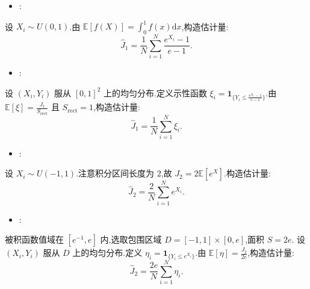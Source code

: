 \documentclass[../main.tex]{subfiles}
\begin{document}
\begin{solution}


\begin{itemize}
    \item {}:
\end{itemize}
    设 $X_i \sim U(0, 1)$.由 $\mathbb{E}[f(X)] = \int_0^1 f(x)\mathrm{d}x$,构造估计量:
    $$\hat{J}_1 = \frac{1}{N} \sum_{i=1}^N \frac{e^{X_i} - 1}{e - 1}.$$
\begin{itemize}
    \item {}:
\end{itemize}
    设 $(X_i, Y_i)$ 服从 $[0, 1]^2$ 上的均匀分布.定义示性函数 $\xi_i = \mathbf{1}_{\{Y_i \le \frac{e^{X_i}-1}{e-1}\}}$.由 $\mathbb{E}[\xi] = \frac{J_1}{S_{\text{rect}}}$ 且 $S_{\text{rect}}=1$,构造估计量:
    $$\hat{J}_1 = \frac{1}{N} \sum_{i=1}^N \xi_i.$$


\begin{itemize}
    \item {}:
\end{itemize}
    设 $X_i \sim U(-1, 1)$.注意积分区间长度为 $2$,故 $J_2 = 2\mathbb{E}[e^X]$.构造估计量:
    $$\hat{J}_2 = \frac{2}{N} \sum_{i=1}^N e^{X_i}.$$
\begin{itemize}
    \item {}:
\end{itemize}
    被积函数值域在 $[e^{-1}, e]$ 内,选取包围区域 $D = [-1, 1] \times [0, e]$,面积 $S = 2e$.
    设 $(X_i, Y_i)$ 服从 $D$ 上的均匀分布.定义 $\eta_i = \mathbf{1}_{\{Y_i \le e^{X_i}\}}$.由 $\mathbb{E}[\eta] = \frac{J_2}{2e}$,构造估计量:
    $$\hat{J}_2 = \frac{2e}{N} \sum_{i=1}^N \eta_i.$$
\end{solution}
\end{document}
